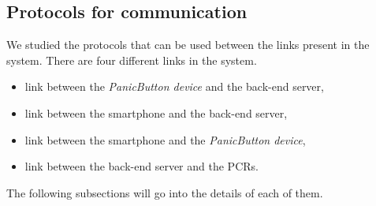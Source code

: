 \subsection{Protocols for communication}
We studied the protocols that can be used between the links present in the system. There are four different links in the system.
\begin{itemize}
\item link between the \emph{PanicButton device} and the back-end server,
\item link between the smartphone and the back-end server,
\item link between the smartphone and the \emph{PanicButton device},
\item link between the back-end server and the PCRs.
\end{itemize}
The following subsections will go into the details of each of them.
